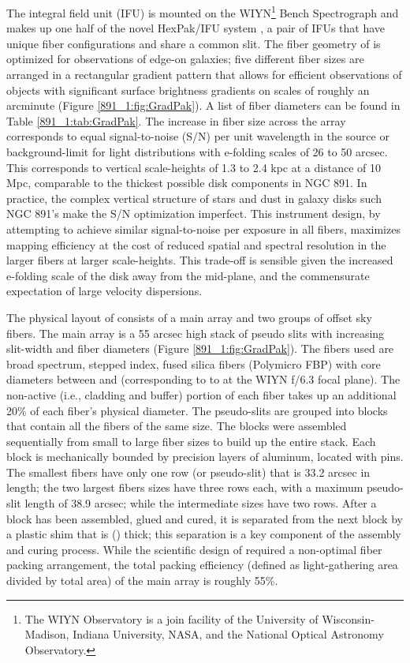The \GP integral field unit (IFU) is mounted on the WIYN\footnote{The
  WIYN Observatory is a join facility of the University of
  Wisconsin-Madison, Indiana University, NASA, and the National
  Optical Astronomy Observatory.}  Bench Spectrograph
\citep{Barden94,Bershady08,Knezek10} and makes up one half of the
novel HexPak/\GP IFU system \citep{Wood12}, a pair of IFUs that have
unique fiber configurations and share a common slit. The fiber
geometry of \GP is optimized for observations of edge-on galaxies;
five different fiber sizes are arranged in a rectangular gradient
pattern that allows for efficient observations of objects with
significant surface brightness gradients on scales of roughly an
arcminute (Figure \ref{891_1:fig:GradPak}).  A list of fiber diameters can
be found in Table \ref{891_1:tab:GradPak}. The increase in fiber size across
the array corresponds to equal signal-to-noise (S/N) per unit
wavelength in the source or background-limit for light distributions
with e-folding scales of 26 to 50 arcsec. This corresponds to vertical
scale-heights of 1.3 to 2.4 kpc at a distance of 10 Mpc, comparable to
the thickest possible disk components in NGC 891.  In practice, the
complex vertical structure of stars and dust in galaxy disks such NGC
891's make the S/N optimization imperfect. This instrument design, by
attempting to achieve similar signal-to-noise per exposure in all
fibers, maximizes mapping efficiency at the cost of reduced spatial
and spectral resolution in the larger fibers at larger
scale-heights. This trade-off is sensible given the increased
e-folding scale of the disk away from the mid-plane, and the
commensurate expectation of large velocity dispersions.

The physical layout of \GP consists of a main array and two groups of
offset sky fibers. The main array is a 55 arcsec high stack of pseudo
slits with increasing slit-width and fiber diameters (Figure
\ref{891_1:fig:GradPak}). The fibers used are broad spectrum, stepped index,
fused silica fibers (Polymicro FBP) with core diameters between
 and  (corresponding to 
to  at the WIYN f/6.3 focal plane). The non-active
(i.e., cladding and buffer) portion of each fiber takes up an
additional 20\% of each fiber's physical diameter. The pseudo-slits
are grouped into blocks that contain all the fibers of the same
size. The blocks were assembled sequentially from small to large fiber
sizes to build up the entire stack. Each block is mechanically bounded
by precision layers of aluminum, located with pins. The smallest
fibers have only one row (or pseudo-slit) that is 33.2 arcsec in
length; the two largest fibers sizes have three rows each, with a
maximum pseudo-slit length of 38.9 arcsec; while the intermediate
sizes have two rows. After a block has been assembled, glued and
cured, it is separated from the next block by a plastic shim that is
 () thick; this separation is a key
component of the assembly and curing process.  While the scientific
design of \GP required a non-optimal fiber packing arrangement, the
total packing efficiency (defined as light-gathering area divided by
total area) of the main array is roughly 55\%.

